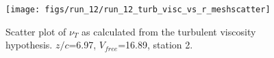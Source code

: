 \begin{figure}[H]
\centering
\texttt{[image: figs/run\_12/run\_12\_turb\_visc\_vs\_r\_meshscatter]}
\caption{Scatter plot of $\nu_T$ as calculated from the turbulent viscosity hypothesis. $z/c$=6.97, $V_{free}$=16.89, station 2.}
\label{fig:run_12_turb_visc_vs_r_meshscatter}
\end{figure}


